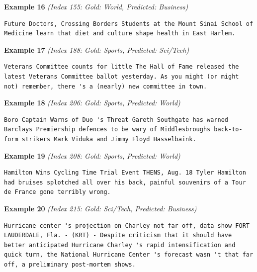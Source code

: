 \noindent
\textbf{Example 16} \quad \textit{(Index 155: Gold: World, Predicted: Business)}

\begin{Verbatim}[breaklines=true,breakanywhere=true,fontsize=\small]
Future Doctors, Crossing Borders Students at the Mount Sinai School of Medicine learn that diet and culture shape health in East Harlem.
\end{Verbatim}

\noindent
\textbf{Example 17} \quad \textit{(Index 188: Gold: Sports, Predicted: Sci/Tech)}

\begin{Verbatim}[breaklines=true,breakanywhere=true,fontsize=\small]
Veterans Committee counts for little The Hall of Fame released the latest Veterans Committee ballot yesterday. As you might (or might not) remember, there 's a (nearly) new committee in town.
\end{Verbatim}

\noindent
\textbf{Example 18} \quad \textit{(Index 206: Gold: Sports, Predicted: World)}

\begin{Verbatim}[breaklines=true,breakanywhere=true,fontsize=\small]
Boro Captain Warns of Duo 's Threat Gareth Southgate has warned Barclays Premiership defences to be wary of Middlesbroughs back-to-form strikers Mark Viduka and Jimmy Floyd Hasselbaink.
\end{Verbatim}

\noindent
\textbf{Example 19} \quad \textit{(Index 208: Gold: Sports, Predicted: World)}

\begin{Verbatim}[breaklines=true,breakanywhere=true,fontsize=\small]
Hamilton Wins Cycling Time Trial Event THENS, Aug. 18 Tyler Hamilton had bruises splotched all over his back, painful souvenirs of a Tour de France gone terribly wrong.
\end{Verbatim}

\noindent
\textbf{Example 20} \quad \textit{(Index 215: Gold: Sci/Tech, Predicted: Business)}

\begin{Verbatim}[breaklines=true,breakanywhere=true,fontsize=\small]
Hurricane center 's projection on Charley not far off, data show FORT LAUDERDALE, Fla. - (KRT) - Despite criticism that it should have better anticipated Hurricane Charley 's rapid intensification and quick turn, the National Hurricane Center 's forecast wasn 't that far off, a preliminary post-mortem shows.
\end{Verbatim}

